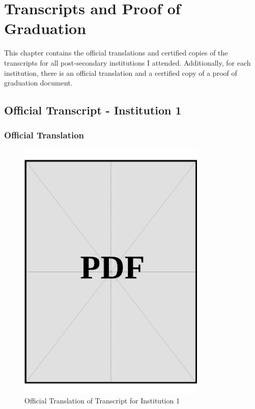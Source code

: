 \chapter{Transcripts and Proof of Graduation}\label{sec:transcripts-and-proof-of-graduation}

This chapter contains the official translations and certified copies of the transcripts for all post-secondary institutions I attended. Additionally, for each institution, there is an official translation and a certified copy of a proof of graduation document.

\clearpage

\section{Official Transcript - Institution 1}\label{sec:institution-1-transcript}

\subsection*{Official Translation}
\vspace*{\fill}

\begin{figure}[h]
    \centering
    \includegraphics[page=1, width=0.8\textwidth]{../docs/applicant/post-secondary-institutions/institution-1/transcript/official-translations.pdf}
    \caption{Official Translation of Transcript for Institution 1}
    \label{fig:institution-1-transcript-official-translation}
\end{figure}
\vspace*{\fill}

